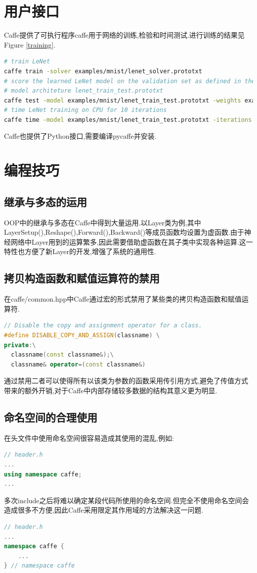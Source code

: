 \documentclass[a4paper]{article}
\begin{document}
	\section{用户接口}
	Caffe提供了可执行程序caffe用于网络的训练,检验和时间测试.进行训练的结果见Figure \ref{training}.
	\begin{lstlisting}[language=bash]
# train LeNet
caffe train -solver examples/mnist/lenet_solver.prototxt
# score the learned LeNet model on the validation set as defined in the
# model architeture lenet_train_test.prototxt
caffe test -model examples/mnist/lenet_train_test.prototxt -weights examples/mnist/lenet_iter_10000.caffemodel -gpu 0 -iterations 100
# time LeNet training on CPU for 10 iterations
caffe time -model examples/mnist/lenet_train_test.prototxt -iterations 10
	\end{lstlisting}
	Caffe也提供了Python接口,需要编译pycaffe并安装.
	
	\section{编程技巧}
	\subsection{继承与多态的运用}
	OOP中的继承与多态在Caffe中得到大量运用.以Layer类为例,其中LayerSetup(),Reshape(),Forward(),Backward()等成员函数均设置为虚函数.由于神经网络中Layer用到的运算繁多,因此需要借助虚函数在其子类中实现各种运算.这一特性也方便了新Layer的开发,增强了系统的通用性.
	\subsection{拷贝构造函数和赋值运算符的禁用}
	在caffe/common.hpp中Caffe通过宏的形式禁用了某些类的拷贝构造函数和赋值运算符.
	\begin{lstlisting}[language=C++]
// Disable the copy and assignment operator for a class.
#define DISABLE_COPY_AND_ASSIGN(classname) \
private:\
  classname(const classname&);\
  classname& operator=(const classname&)
	\end{lstlisting}
	通过禁用二者可以使得所有以该类为参数的函数采用传引用方式,避免了传值方式带来的额外开销,对于Caffe中内部存储较多数据的结构其意义更为明显.
	\subsection{命名空间的合理使用}
	在头文件中使用命名空间很容易造成其使用的混乱,例如:
	\begin{lstlisting}[language=C++]
// header.h
...
using namespace caffe;
...
	\end{lstlisting}
	多次include之后将难以确定某段代码所使用的命名空间.但完全不使用命名空间会造成很多不方便,因此Caffe采用限定其作用域的方法解决这一问题.
	\begin{lstlisting}[language=C++]
// header.h
...
namespace caffe {
    ...
} // namespace caffe
	\end{lstlisting}
	
	
	
\end{document}
